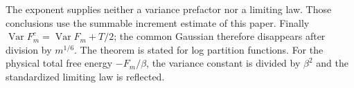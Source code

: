 The exponent supplies neither a variance prefactor nor a limiting law.
Those conclusions use the summable increment estimate of this paper.
Finally $\operatorname{Var}F_m^c=\operatorname{Var}F_m+T/2$; the common
Gaussian therefore disappears after division by $m^{1/6}$. The theorem
is stated for log partition functions. For the physical total free
energy $-F_m/\beta$, the variance constant is divided by $\beta^2$
and the standardized limiting law is reflected.
